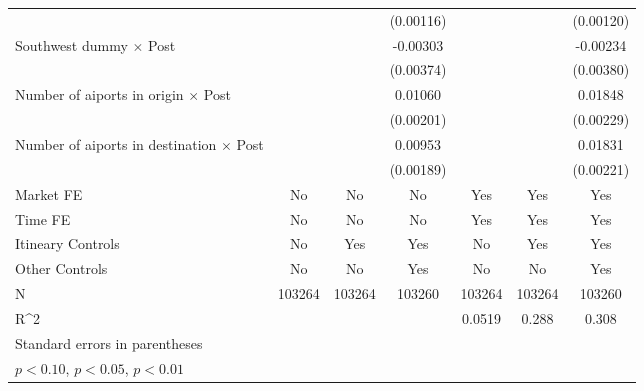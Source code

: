 \begin{table}[htbp]
\begin{tabular}{l*{6}{c}}
                    &                     &                     &   (0.00116)         &                     &                     &   (0.00120)         \\
\addlinespace
Southwest dummy $\times$ Post&                     &                     &    -0.00303         &                     &                     &    -0.00234         \\
                    &                     &                     &   (0.00374)         &                     &                     &   (0.00380)         \\
\addlinespace
Number of aiports in origin $\times$ Post&                     &                     &     0.01060\sym{***}&                     &                     &     0.01848\sym{***}\\
                    &                     &                     &   (0.00201)         &                     &                     &   (0.00229)         \\
\addlinespace
Number of aiports in destination $\times$ Post&                     &                     &     0.00953\sym{***}&                     &                     &     0.01831\sym{***}\\
                    &                     &                     &   (0.00189)         &                     &                     &   (0.00221)         \\
\midrule
Market FE           &          No         &          No         &          No         &         Yes         &         Yes         &         Yes         \\
Time FE             &          No         &          No         &          No         &         Yes         &         Yes         &         Yes         \\
Itineary Controls   &          No         &         Yes         &         Yes         &          No         &         Yes         &         Yes         \\
Other Controls      &          No         &          No         &         Yes         &          No         &          No         &         Yes         \\
N                   &      103264         &      103264         &      103260         &      103264         &      103264         &      103260         \\
R^2                 &                     &                     &                     &      0.0519         &       0.288         &       0.308         \\
\bottomrule
\multicolumn{7}{l}{\footnotesize Standard errors in parentheses}\\
\multicolumn{7}{l}{\footnotesize \sym{*} \(p<0.10\), \sym{**} \(p<0.05\), \sym{***} \(p<0.01\)}\\
\end{tabular}
\end{table}
